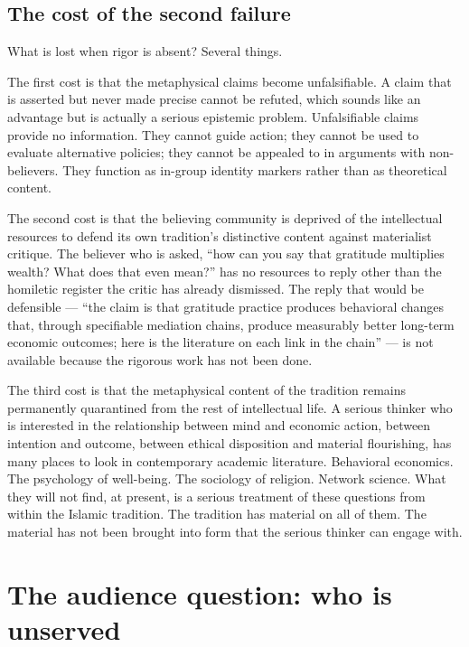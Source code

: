 \subsection{The cost of the second failure}

What is lost when rigor is absent? Several things.

The first cost is that the metaphysical claims become unfalsifiable.
A claim that is asserted but never made precise cannot be refuted,
which sounds like an advantage but is actually a serious epistemic
problem. Unfalsifiable claims provide no information. They cannot
guide action; they cannot be used to evaluate alternative policies;
they cannot be appealed to in arguments with non-believers. They
function as in-group identity markers rather than as theoretical
content.

The second cost is that the believing community is deprived of the
intellectual resources to defend its own tradition's distinctive
content against materialist critique. The believer who is asked,
``how can you say that gratitude multiplies wealth? What does that
even mean?'' has no resources to reply other than the homiletic
register the critic has already dismissed. The reply that would be
defensible --- ``the claim is that gratitude practice produces
behavioral changes that, through specifiable mediation chains,
produce measurably better long-term economic outcomes; here is the
literature on each link in the chain'' --- is not available because
the rigorous work has not been done.

The third cost is that the metaphysical content of the tradition
remains permanently quarantined from the rest of intellectual life.
A serious thinker who is interested in the relationship between
mind and economic action, between intention and outcome, between
ethical disposition and material flourishing, has many places to
look in contemporary academic literature. Behavioral economics. The
psychology of well-being. The sociology of religion. Network science.
What they will not find, at present, is a serious treatment of these
questions from within the Islamic tradition. The tradition has
material on all of them. The material has not been brought into
form that the serious thinker can engage with.

\section{The audience question: who is unserved}
\label{sec:audience}

